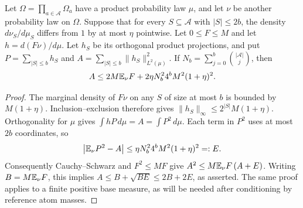 \begin{lemma}
\label{sampling:gram}
Let $\Omega=\prod_{a\in\mathcal A}\Omega_a$ have a product probability law
$\mu$, and let $\nu$ be another probability law on $\Omega$.  Suppose that
for every $S\subseteq\mathcal A$ with $|S|\le2b$, the density
$d\nu_S/d\mu_S$ differs from $1$ by at most $\eta$ pointwise.
Let $0\le F\le M$ and let $h=d(F\nu)/d\mu$.  Let $h_S$ be its orthogonal
product projections, and put $P=\sum_{|S|\le b}h_S$ and
$A=\sum_{|S|\le b}\|h_S\|_{L^2(\mu)}^2$.  If
$N_b=\sum_{j=0}^b\binom{|\mathcal A|}{j}$, then
\[
 A\le 2M\mathbb E_\nu F+2\eta N_b^2 4^bM^2(1+\eta)^2.
\]
\end{lemma}
\begin{proof}
The marginal density of $F\nu$ on any $S$ of size at most $b$ is bounded
by $M(1+\eta)$.  Inclusion--exclusion therefore gives
$\|h_S\|_\infty\le2^{|S|}M(1+\eta)$.
Orthogonality for $\mu$ gives $\int hP\,d\mu=A=\int P^2\,d\mu$.
Each term in $P^2$ uses at most $2b$ coordinates, so
\[
 \left|\mathbb E_\nu P^2-A\right|
 \le\eta N_b^2 4^bM^2(1+\eta)^2=:E.
\]
Consequently Cauchy--Schwarz and $F^2\le MF$ give
$A^2\le M\mathbb E_\nu F\,(A+E)$.  Writing $B=M\mathbb E_\nu F$, this implies
$A\le B+\sqrt{BE}\le2B+2E$, as asserted.
The same proof applies to a finite positive base measure, as will be
needed after conditioning by reference atom masses.
\end{proof}


